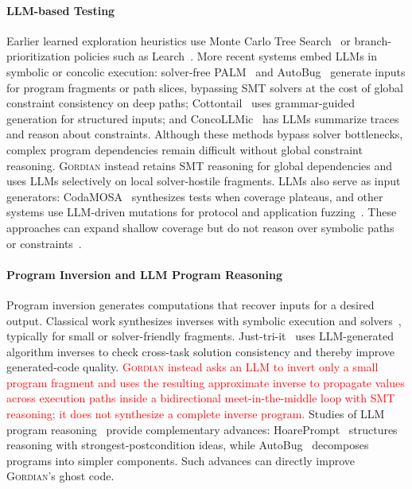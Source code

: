 \documentclass[acmsmall]{acmart}
\newcommand{\rev}[1]{\textcolor{red}{#1}}
\newcommand{\rev}[1]{#1}
\newcommand{\projName}{\textsc{Gordian}\xspace}
\theoremstyle{definition}
\begin{document}
\paragraph*{LLM-based Testing} Earlier learned exploration heuristics use Monte Carlo Tree Search~\cite{legion} or branch-prioritization policies such as Learch~\cite{learch}. More recent systems embed LLMs in symbolic or concolic execution: solver-free PALM~\cite{palm} and AutoBug~\cite{autobug} generate inputs for program fragments or path slices, bypassing SMT solvers at the cost of global constraint consistency on deep paths; Cottontail~\cite{cottontail} uses grammar-guided generation for structured inputs; and ConcoLLMic~\cite{concollmic} has LLMs summarize traces and reason about constraints. Although these methods bypass solver bottlenecks, complex program dependencies remain difficult without global constraint reasoning. \projName{} instead retains SMT reasoning for global dependencies and uses LLMs selectively on local solver-hostile fragments. LLMs also serve as input generators: CodaMOSA~\cite{codamosa} synthesizes tests when coverage plateaus, and other systems use LLM-driven mutations for protocol and application fuzzing~\cite{chatfuzz,inputblaster}. These approaches can expand shallow coverage but do not reason over symbolic paths or constraints~\cite{manes_fuzzing_survey}.

\paragraph*{Program Inversion and LLM Program Reasoning} Program inversion generates computations that recover inputs for a desired output. Classical work synthesizes inverses with symbolic execution and solvers~\cite{srivastava2011path,Abramov2000InverseComputation}, typically for small or solver-friendly fragments. Just-tri-it~\cite{dai2025reducing} uses LLM-generated algorithm inverses to check cross-task solution consistency and thereby improve generated-code quality. \rev{\projName{} instead asks an LLM to invert only a small program fragment and uses the resulting approximate inverse to propagate values across execution paths inside a bidirectional meet-in-the-middle loop with SMT reasoning; it does not synthesize a complete inverse program.} Studies of LLM program reasoning~\cite{chen2024reasoning,liu2025evaluating} provide complementary advances: HoarePrompt~\cite{bouras2025hoareprompt} structures reasoning with strongest-postcondition ideas, while AutoBug~\cite{autobug} decomposes programs into simpler components. Such advances can directly improve \projName{}'s ghost code.
\end{document}
